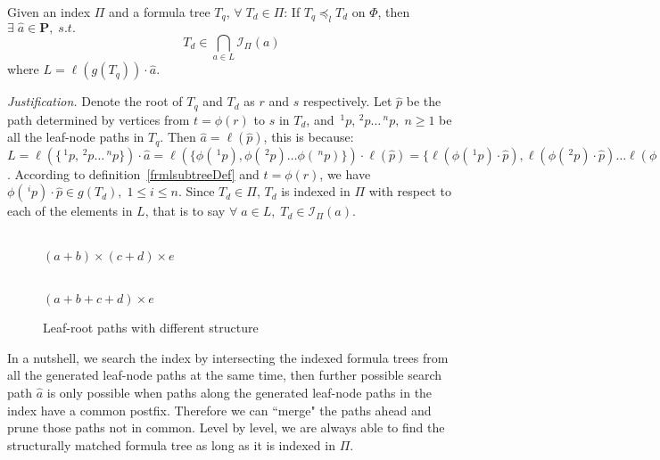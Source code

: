\documentclass{acm_proc_article-sp}
\begin{document}
Given an index $\Pi$ and a formula tree $T_q$, $\forall\; T_d \in \Pi$:
If $T_q \preceq_l T_d$ on $\Phi$, then $\exists\; \hat{a} \in \mathbf{P},\; s.t.$
$$
T_d \in \bigcap_{a \in L} \mathcal{I}_{\Pi}(a)
$$
where $L = \ell(g(T_q)) \cdot \hat{a}$.

\textit{Justification.}
Denote the root of $T_q$ and $T_d$ as $r$ and $s$ respectively.
Let $\hat{p}$ be the path determined by vertices from $t=\phi(r)$ to $s$ in $T_d$,
and $\,^1p, \,^2p \ldots \,^np,\; n \ge 1$ be all the leaf-node paths in $T_q$.
Then $\hat{a} = \ell(\hat{p})$, this is because:
$L = \ell(\{ \,^1p, \,^2p \ldots \,^np \}) \cdot \hat{a} = 
\ell(\{ \phi(\,^1p), \phi(\,^2p) \ldots \phi(\,^np) \}) \cdot \ell(\hat{p}) =
\{ \ell(\phi(\,^1p) \cdot \hat{p}), \ell(\phi(\,^2p) \cdot \hat{p}) \ldots \ell(\phi(\,^np) \cdot \hat{p}) \}
$.
According to definition~\ref{frmlsubtreeDef} and $t=\phi(r)$, we have $\phi(\,^ip) \cdot \hat{p} \in g(T_d),\; 1 \le i \le n$.
Since $ T_d \in \Pi$, $T_d$ is indexed in $\Pi$ with respect to each of the elements in $L$, that is to say $\forall\; a \in L, \; T_d \in \mathcal{I}_{\Pi}(a)$.

\begin{figure}
\begin{minipage}[b]{1.65in}
\begin{center}
\\ $(a+b) \times (c+d) \times e$
\end{center}
\end{minipage}
\hspace*{.0in}
\begin{minipage}[b]{1.60in}
\begin{center}
\\ $(a+b+c+d) \times e$
\end{center}
\end{minipage}
\caption{Leaf-root paths with different structure}\label{notnecessary}
\end{figure}

In a nutshell, we search the index by intersecting the indexed formula trees from all the generated leaf-node paths at the same time, then further possible search path $\hat{a}$ is only possible when paths along the generated leaf-node paths in the index have a common postfix.
Therefore we can ``merge" the paths ahead and prune those paths not in common. Level by level, we are always able to find the structurally matched formula tree as long as it is indexed in $\Pi$.
\end{document}

